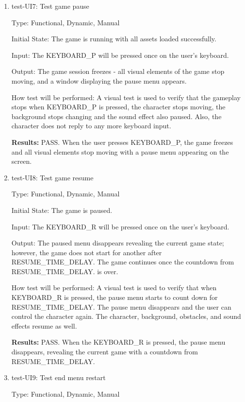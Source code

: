 \documentclass[12pt, titlepage]{article}
\begin{document}
\begin{enumerate}
\item{test-UI7: Test game pause\\}

Type: Functional, Dynamic, Manual
					
Initial State: The game is running with all assets loaded successfully.
					
Input: The KEYBOARD\_P will be pressed once on the user's keyboard.
					
Output: The game session freezes - all visual elements of the game stop moving, and a window displaying the pause menu appears.
					
How test will be performed: A visual test is used to verify that the gameplay stops when KEYBOARD\_P is pressed, the character stops moving, the background stops changing and the sound effect also paused. Also, the character does not reply to any more keyboard input.

\textbf{Results:} PASS. When the user presses KEYBOARD\_P, the game freezes and all visual elements stop moving with a pause menu appearing on the screen. 
				
\item{test-UI8: Test game resume\\}

Type: Functional, Dynamic, Manual
					
Initial State: The game is paused.
					
Input: The KEYBOARD\_R will be pressed once on the user's keyboard.
					
Output: The paused menu disappears revealing the current game state; however, the game does not start for another after RESUME\_TIME\_DELAY. The game continues once the countdown from RESUME\_TIME\_DELAY. is over.
					
How test will be performed: A visual test is used to verify that when KEYBOARD\_R is pressed, the pause menu starts to count down for RESUME\_TIME\_DELAY. The pause menu disappears and the user can control the character again. The character, background, obstacles, and sound effects resume as well.

\textbf{Results:} PASS. When the KEYBOARD\_R is pressed, the pause menu disappears, revealing the current game with a countdown from\\
RESUME\_TIME\_DELAY.

\item{test-UI9: Test end menu restart\\}

Type: Functional, Dynamic, Manual
					

\end{enumerate}
\end{document}
